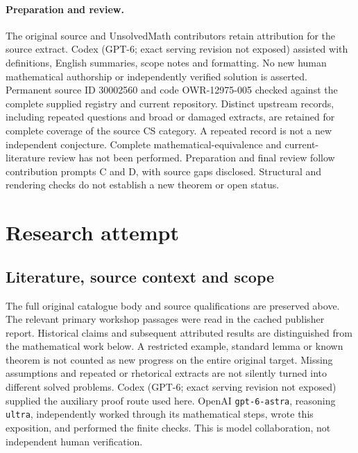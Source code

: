 \documentclass[11pt]{article}
\begin{document}
\paragraph{Preparation and review.}
The original source and UnsolvedMath contributors retain attribution for the source extract. Codex (GPT-6; exact serving revision not exposed) assisted with definitions, English summaries, scope notes and formatting. No new human mathematical authorship or independently verified solution is asserted. Permanent source ID 30002560 and code OWR-12975-005 checked against the complete supplied registry and current repository. Distinct upstream records, including repeated questions and broad or damaged extracts, are retained for complete coverage of the source CS category. A repeated record is not a new independent conjecture. Complete mathematical-equivalence and current-literature review has not been performed. Preparation and final review follow contribution prompts C and D, with source gaps disclosed. Structural and rendering checks do not establish a new theorem or open status.
\label{end:30002560}

\section{Research attempt}
\subsection{Literature, source context and scope}
The full original catalogue body and source qualifications are preserved above. The relevant primary workshop passages were read in the cached publisher report. Historical claims and subsequent attributed results are distinguished from the mathematical work below. A restricted example, standard lemma or known theorem is not counted as new progress on the entire original target. Missing assumptions and repeated or rhetorical extracts are not silently turned into different solved problems.
Codex (GPT-6; exact serving revision not exposed) supplied the auxiliary proof route used here. OpenAI \texttt{gpt-6-astra}, reasoning \texttt{ultra}, independently worked through its mathematical steps, wrote this exposition, and performed the finite checks. This is model collaboration, not independent human verification.
\end{document}
